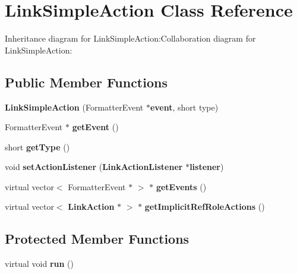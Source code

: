 \section{LinkSimpleAction Class Reference}
\label{classbr_1_1pucrio_1_1telemidia_1_1ginga_1_1ncl_1_1model_1_1link_1_1LinkSimpleAction}
Inheritance diagram for LinkSimpleAction:Collaboration diagram for LinkSimpleAction:\subsection*{Public Member Functions}
\begin{CompactItemize}
\item 
\textbf{LinkSimpleAction} (FormatterEvent $\ast${\bf event}, short type)\label{classbr_1_1pucrio_1_1telemidia_1_1ginga_1_1ncl_1_1model_1_1link_1_1LinkSimpleAction_fd80c0f5f6e7d8a525c1e1472a5f4519}

\item 
FormatterEvent $\ast$ \textbf{getEvent} ()\label{classbr_1_1pucrio_1_1telemidia_1_1ginga_1_1ncl_1_1model_1_1link_1_1LinkSimpleAction_3efa52713f97472630a2e5507559830d}

\item 
short \textbf{getType} ()\label{classbr_1_1pucrio_1_1telemidia_1_1ginga_1_1ncl_1_1model_1_1link_1_1LinkSimpleAction_e61d3221a08c2a035515c18f26874933}

\item 
void \textbf{setActionListener} ({\bf LinkActionListener} $\ast${\bf listener})\label{classbr_1_1pucrio_1_1telemidia_1_1ginga_1_1ncl_1_1model_1_1link_1_1LinkSimpleAction_34b0fd8ac4e998e05daf49b7fc19c721}

\item 
virtual vector$<$ FormatterEvent $\ast$ $>$ $\ast$ \textbf{getEvents} ()\label{classbr_1_1pucrio_1_1telemidia_1_1ginga_1_1ncl_1_1model_1_1link_1_1LinkSimpleAction_77d29bf7857d5b09d0ef4fb69cfc31cd}

\item 
virtual vector$<$ {\bf LinkAction} $\ast$ $>$ $\ast$ \textbf{getImplicitRefRoleActions} ()\label{classbr_1_1pucrio_1_1telemidia_1_1ginga_1_1ncl_1_1model_1_1link_1_1LinkSimpleAction_adcae512f9241400f1d53744415530a9}

\end{CompactItemize}
\subsection*{Protected Member Functions}
\begin{CompactItemize}
\item 
virtual void \textbf{run} ()\label{classbr_1_1pucrio_1_1telemidia_1_1ginga_1_1ncl_1_1model_1_1link_1_1LinkSimpleAction_72fcb26a14f6beb1c3fbace9ab3e7dbb}

\end{CompactItemize}
